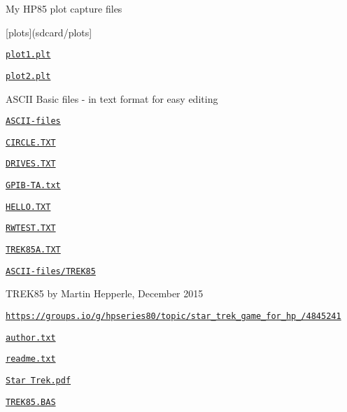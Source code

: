 \begin{DoxyItemize}
\begin{DoxyItemize}
\begin{DoxyItemize}
\begin{DoxyItemize}
\end{DoxyItemize}
\item My H\+P85 plot capture files
\begin{DoxyItemize}
\item \mbox{[}plots\mbox{]}(sdcard/plots\mbox{]}
\begin{DoxyItemize}
\item \href{sdcard/plots/plot1.plt}{\tt plot1.\+plt}
\item \href{sdcard/plots/plot2.plt}{\tt plot2.\+plt}
\end{DoxyItemize}
\end{DoxyItemize}
\item A\+S\+C\+II Basic files -\/ in text format for easy editing
\begin{DoxyItemize}
\item \href{sdcard/ASCII-files}{\tt A\+S\+C\+I\+I-\/files}
\begin{DoxyItemize}
\item \href{sdcard/ASCII-files/CIRCLE.TXT}{\tt C\+I\+R\+C\+L\+E.\+T\+XT}
\item \href{sdcard/ASCII-files/DRIVES.TXT}{\tt D\+R\+I\+V\+E\+S.\+T\+XT}
\item \href{sdcard/ASCII-files/GPIB-TA.txt}{\tt G\+P\+I\+B-\/\+T\+A.\+txt}
\item \href{sdcard/ASCII-files/HELLO.TXT}{\tt H\+E\+L\+L\+O.\+T\+XT}
\item \href{sdcard/ASCII-files/RWTEST.TXT}{\tt R\+W\+T\+E\+S\+T.\+T\+XT}
\item \href{sdcard/ASCII-files/TREK85A.TXT}{\tt T\+R\+E\+K85\+A.\+T\+XT}
\item \href{sdcard/ASCII-files/TREK85}{\tt A\+S\+C\+I\+I-\/files/\+T\+R\+E\+K85}
\begin{DoxyItemize}
\item T\+R\+E\+K85 by Martin Hepperle, December 2015
\begin{DoxyItemize}
\item \href{https://groups.io/g/hpseries80/topic/star_trek_game_for_hp_85/4845241}{\tt https\+://groups.\+io/g/hpseries80/topic/star\+\_\+trek\+\_\+game\+\_\+for\+\_\+hp\+\_/4845241}
\end{DoxyItemize}
\item \href{sdcard/TREK85/author.txt}{\tt author.\+txt}
\item \href{sdcrad/TREK85/readme.txt}{\tt readme.\+txt}
\item \href{sdcard/TREK85/Start Trek.pdf}{\tt Star Trek.\+pdf}
\item \href{sdcard/TREK85/TREK85.BAS}{\tt T\+R\+E\+K85.\+B\+AS}

\end{DoxyItemize}
\end{DoxyItemize}
\end{DoxyItemize}
\end{DoxyItemize}
\end{DoxyItemize}
\end{DoxyItemize}
